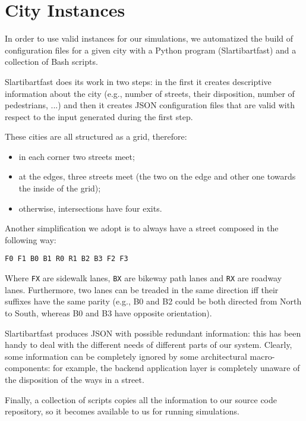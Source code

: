\section{City Instances}

In order to use valid instances for our simulations, we automatized the build
of configuration files for a given city with a Python program (Slartibartfast)
and a collection of Bash scripts.

Slartibartfast does its work in two steps: in the first it creates
descriptive information about the city (e.g., number of streets, their
disposition, number of pedestrians, ...) and then it creates JSON configuration
files that are valid with respect to the input generated during the first step.

These cities are all structured as a grid, therefore:

\begin{itemize}
    \item in each corner two streets meet;
    \item at the edges, three streets meet (the two on the edge and other one
        towards the inside of the grid);
    \item otherwise, intersections have four exits.
\end{itemize}

Another simplification we adopt is to always have a street composed in the
following way:

\begin{verbatim}
F0 F1 B0 B1 R0 R1 B2 B3 F2 F3
\end{verbatim}

Where \texttt{FX} are sidewalk lanes, \texttt{BX} are bikeway path lanes and
\texttt{RX} are roadway lanes. Furthermore, two lanes can be treaded in the
same direction iff their suffixes have the same parity (e.g., B0 and B2
could be both directed from North to South, whereas B0 and B3 have opposite
orientation).

Slartibartfast produces JSON with possible redundant information: this has
been handy to deal with the different needs of different parts of our system.
Clearly, some information can be completely ignored by some architectural
macro-components: for example, the backend application layer is completely
unaware of the disposition of the ways in a street.

Finally, a collection of scripts copies all the information to our source code
repository, so it becomes available to us for running simulations.
